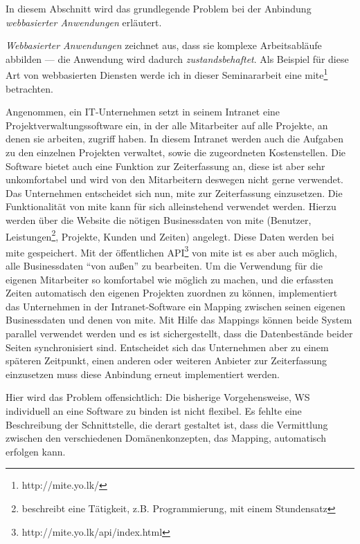In diesem Abschnitt wird das grundlegende Problem bei der Anbindung \emph{webbasierter Anwendungen} erläutert.

\bigskip

\emph{Webbasierter Anwendungen} zeichnet aus, dass sie komplexe Arbeitsabläufe abbilden --- die Anwendung wird dadurch \emph{zustandsbehaftet}. Als Beispiel für diese Art von webbasierten Diensten werde ich in dieser Seminararbeit eine \ac{mite}\footnote{http://mite.yo.lk/} betrachten. 

Angenommen, ein IT-Unternehmen setzt in seinem Intranet eine Projektverwaltungssoftware ein, in der alle Mitarbeiter auf alle Projekte, an denen sie arbeiten, zugriff haben. In diesem Intranet werden auch die Aufgaben zu den einzelnen Projekten verwaltet, sowie die zugeordneten Kostenstellen. Die Software bietet auch eine Funktion zur Zeiterfassung an, diese ist aber sehr unkomfortabel und wird von den Mitarbeitern deswegen nicht gerne verwendet. Das Unternehmen entscheidet sich nun, \ac{mite} zur Zeiterfassung einzusetzen. Die Funktionalität von \ac{mite} kann für sich alleinstehend verwendet werden. Hierzu werden über die Website die nötigen Businessdaten von \ac{mite} (Benutzer, Leistungen\footnote{beschreibt eine Tätigkeit, z.B. Programmierung, mit einem Stundensatz}, Projekte, Kunden und Zeiten) angelegt. Diese Daten werden bei \ac{mite} gespeichert. Mit der öffentlichen \acs{API}\footnote{http://mite.yo.lk/api/index.html} von \ac{mite} ist es aber auch möglich, alle Businessdaten "`von außen"' zu bearbeiten. Um die Verwendung für die eigenen Mitarbeiter so komfortabel wie möglich zu machen, und die erfassten Zeiten automatisch den eigenen Projekten zuordnen zu können, implementiert das Unternehmen in der Intranet-Software ein Mapping zwischen seinen eigenen Businessdaten und denen von \ac{mite}. Mit Hilfe das Mappings können beide System parallel verwendet werden und es ist sichergestellt, dass die Datenbestände beider Seiten synchronisiert sind. Entscheidet sich das Unternehmen aber zu einem späteren Zeitpunkt, einen anderen oder weiteren Anbieter zur Zeiterfassung einzusetzen muss diese Anbindung erneut implementiert werden.

Hier wird das Problem offensichtlich: Die bisherige Vorgehensweise, \acl{WS} individuell an eine Software zu binden ist nicht flexibel. Es fehlte eine Beschreibung der Schnittstelle, die derart gestaltet ist, dass die Vermittlung zwischen den verschiedenen Domänenkonzepten, das Mapping, automatisch erfolgen kann.

